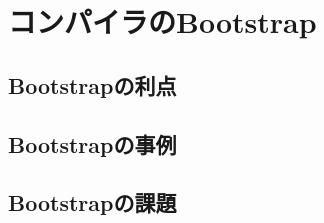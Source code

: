 \chapter{コンパイラのBootstrap}
\label{solv}

\section{Bootstrapの利点}

\section{Bootstrapの事例}
\label{solv:env}

\section{Bootstrapの課題}
\label{solv:requirements}

